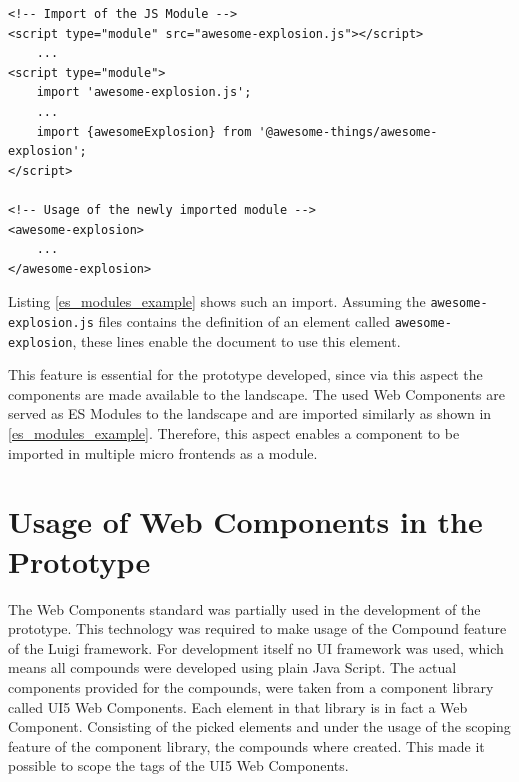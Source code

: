 \begin{lstlisting}[language=HTML5, caption=Importing modular Java Script documents into another \cite{wc_specifications}, label=es_modules_example]
<!-- Import of the JS Module -->
<script type="module" src="awesome-explosion.js"></script>
	...
<script type="module">
	import 'awesome-explosion.js';
	...
	import {awesomeExplosion} from '@awesome-things/awesome-explosion';
</script>

<!-- Usage of the newly imported module -->
<awesome-explosion>
	...
</awesome-explosion>
\end{lstlisting}

Listing \ref{es_modules_example} shows such an import. Assuming the \texttt{awesome-explosion.js} files contains the definition of an element called \texttt{awesome-explosion}, these lines enable the document to use this element.\cite{wc_specifications}

This feature is essential for the prototype developed, since via this aspect the components are made available to the landscape. The used Web Components are served as ES Modules to the landscape and are imported similarly as shown in \ref{es_modules_example}. Therefore, this aspect enables a component to be imported in multiple micro frontends as a module.

\section{Usage of Web Components in the Prototype}

The Web Components standard was partially used in the development of the prototype. This technology was required to make usage of the Compound feature of the Luigi framework. \cite{luigi_wc} \cite{luigi_compound}
For development itself no UI framework was used, which means all compounds were developed using plain Java Script. The actual components provided for the compounds, were taken from a component library called UI5 Web Components. Each element in that library is in fact a Web Component.\cite{ui5_wc_github}
Consisting of the picked elements and under the usage of the scoping feature of the component library, the compounds where created. This made it possible to scope the tags of the UI5 Web Components.\cite{ui5_webcomponents_scoping}

